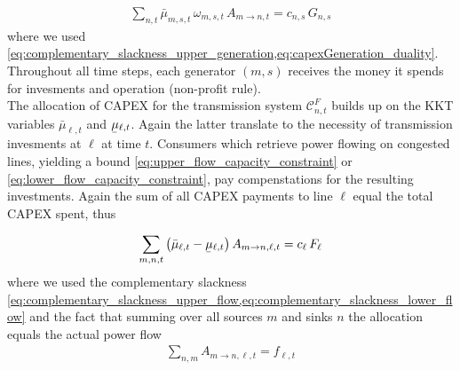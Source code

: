\documentclass[11pt]{article}
\newcommand{\ubar}[1]{\underaccent{\bar}{#1}}
\newcommand{\note}[1]{\textcolor{Orange}{#1}}
\newcommand{\generation}[1][n]{g_{#1,s,t}}
\newcommand{\generationshare}[1][n]{\omega_{#1,s,t}}
\newcommand{\capacityGeneration}{G_{n,s}}
\newcommand{\capacityFlow}{F_{\ell}}
\newcommand{\capexGeneration}{c_{n,s}}
\newcommand{\capexFlow}{c_{\ell}}
\newcommand{\opexGeneration}[1][n]{o_{#1,s}}
\newcommand{\demand}[1][n]{d_{#1,a,t}}
\newcommand{\incidence}[1][n]{K_{#1,\ell}}
\newcommand{\mulowergeneration}[1][n]{\ubar{\mu}_{#1,s,t}}
\newcommand{\muuppergeneration}[1][n]{\bar{\mu}_{#1,s,t}}
\newcommand{\mulowerflow}{\ubar{\mu}_{\ell,t}}
\newcommand{\muupperflow}{\bar{\mu}_{\ell,t}}
\newcommand{\lmp}[1][n]{\lambda_{#1,t}}
\newcommand{\flow}{f_{\ell,t}}
\newcommand{\allocatePeer}[1][m \rightarrow n]{A_{#1,t}}
\newcommand{\allocateTransaction}[1][m \rightarrow n]{A_{#1,\ell,t}}
\newcommand{\allocateCapexFlow}[1][n]{\mathcal{C}^{F}_{#1,t}}
\newcommand{\Forall}[1]{\hspace{20pt} \forall \,\, #1 }
\begin{document}
\begin{align}
 \sum_{n,t} \muuppergeneration[m] \, \generationshare[m] \, \allocatePeer = \capexGeneration \, \capacityGeneration
\end{align}
where we used \cref{eq:complementary_slackness_upper_generation,eq:capexGeneration_duality}. Throughout all time steps, each generator $(m,s)$ receives the money it spends for invesments and operation (non-profit rule). 
\\ 

The allocation of CAPEX for the transmission system $\allocateCapexFlow$ builds up on the KKT variables $\muupperflow$ and $\mulowerflow$. Again the latter translate to the necessity of transmission invesments at $\ell$ at time $t$. Consumers which retrieve power flowing on congested lines, yielding a bound \cref{eq:upper_flow_capacity_constraint} or \eqref{eq:lower_flow_capacity_constraint}, pay compenstations for the resulting investments. Again the sum of all CAPEX payments to line $\ell$ equal the total CAPEX spent, thus

\begin{align}
 \sum_{m,n,t} \left( \muupperflow - \mulowerflow\right) \allocateTransaction = \capexFlow \, \capacityFlow  
\end{align}
where we used the complementary slackness \cref{eq:complementary_slackness_upper_flow,eq:complementary_slackness_lower_flow} and the fact that summing over all sources $m$ and sinks $n$ the allocation equals the actual power flow 
\begin{align}
\sum_{n,m} \allocateTransaction = \flow
\end{align}
\end{document}
